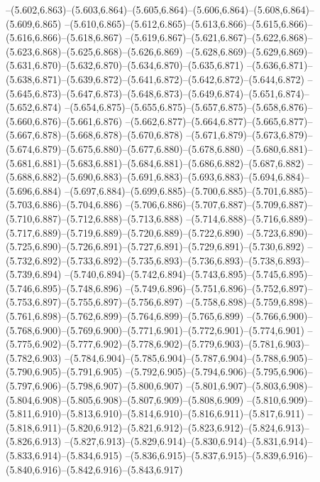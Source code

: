   --(5.602,6.863)--(5.603,6.864)--(5.605,6.864)--(5.606,6.864)--(5.608,6.864)--(5.609,6.865)%
  --(5.610,6.865)--(5.612,6.865)--(5.613,6.866)--(5.615,6.866)--(5.616,6.866)--(5.618,6.867)%
  --(5.619,6.867)--(5.621,6.867)--(5.622,6.868)--(5.623,6.868)--(5.625,6.868)--(5.626,6.869)%
  --(5.628,6.869)--(5.629,6.869)--(5.631,6.870)--(5.632,6.870)--(5.634,6.870)--(5.635,6.871)%
  --(5.636,6.871)--(5.638,6.871)--(5.639,6.872)--(5.641,6.872)--(5.642,6.872)--(5.644,6.872)%
  --(5.645,6.873)--(5.647,6.873)--(5.648,6.873)--(5.649,6.874)--(5.651,6.874)--(5.652,6.874)%
  --(5.654,6.875)--(5.655,6.875)--(5.657,6.875)--(5.658,6.876)--(5.660,6.876)--(5.661,6.876)%
  --(5.662,6.877)--(5.664,6.877)--(5.665,6.877)--(5.667,6.878)--(5.668,6.878)--(5.670,6.878)%
  --(5.671,6.879)--(5.673,6.879)--(5.674,6.879)--(5.675,6.880)--(5.677,6.880)--(5.678,6.880)%
  --(5.680,6.881)--(5.681,6.881)--(5.683,6.881)--(5.684,6.881)--(5.686,6.882)--(5.687,6.882)%
  --(5.688,6.882)--(5.690,6.883)--(5.691,6.883)--(5.693,6.883)--(5.694,6.884)--(5.696,6.884)%
  --(5.697,6.884)--(5.699,6.885)--(5.700,6.885)--(5.701,6.885)--(5.703,6.886)--(5.704,6.886)%
  --(5.706,6.886)--(5.707,6.887)--(5.709,6.887)--(5.710,6.887)--(5.712,6.888)--(5.713,6.888)%
  --(5.714,6.888)--(5.716,6.889)--(5.717,6.889)--(5.719,6.889)--(5.720,6.889)--(5.722,6.890)%
  --(5.723,6.890)--(5.725,6.890)--(5.726,6.891)--(5.727,6.891)--(5.729,6.891)--(5.730,6.892)%
  --(5.732,6.892)--(5.733,6.892)--(5.735,6.893)--(5.736,6.893)--(5.738,6.893)--(5.739,6.894)%
  --(5.740,6.894)--(5.742,6.894)--(5.743,6.895)--(5.745,6.895)--(5.746,6.895)--(5.748,6.896)%
  --(5.749,6.896)--(5.751,6.896)--(5.752,6.897)--(5.753,6.897)--(5.755,6.897)--(5.756,6.897)%
  --(5.758,6.898)--(5.759,6.898)--(5.761,6.898)--(5.762,6.899)--(5.764,6.899)--(5.765,6.899)%
  --(5.766,6.900)--(5.768,6.900)--(5.769,6.900)--(5.771,6.901)--(5.772,6.901)--(5.774,6.901)%
  --(5.775,6.902)--(5.777,6.902)--(5.778,6.902)--(5.779,6.903)--(5.781,6.903)--(5.782,6.903)%
  --(5.784,6.904)--(5.785,6.904)--(5.787,6.904)--(5.788,6.905)--(5.790,6.905)--(5.791,6.905)%
  --(5.792,6.905)--(5.794,6.906)--(5.795,6.906)--(5.797,6.906)--(5.798,6.907)--(5.800,6.907)%
  --(5.801,6.907)--(5.803,6.908)--(5.804,6.908)--(5.805,6.908)--(5.807,6.909)--(5.808,6.909)%
  --(5.810,6.909)--(5.811,6.910)--(5.813,6.910)--(5.814,6.910)--(5.816,6.911)--(5.817,6.911)%
  --(5.818,6.911)--(5.820,6.912)--(5.821,6.912)--(5.823,6.912)--(5.824,6.913)--(5.826,6.913)%
  --(5.827,6.913)--(5.829,6.914)--(5.830,6.914)--(5.831,6.914)--(5.833,6.914)--(5.834,6.915)%
  --(5.836,6.915)--(5.837,6.915)--(5.839,6.916)--(5.840,6.916)--(5.842,6.916)--(5.843,6.917)%
